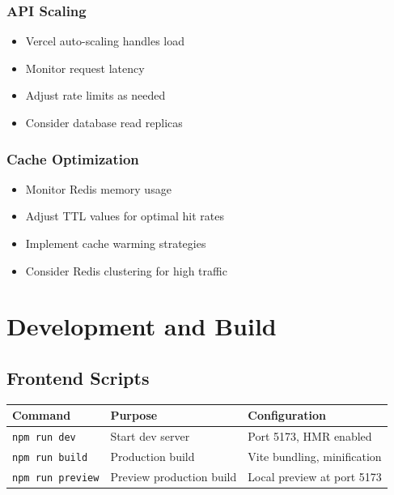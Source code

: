 \documentclass[12pt,a4paper]{report}
\begin{document}
\subsection{API Scaling}

\begin{itemize}
    \item Vercel auto-scaling handles load
    \item Monitor request latency
    \item Adjust rate limits as needed
    \item Consider database read replicas
\end{itemize}

\subsection{Cache Optimization}

\begin{itemize}
    \item Monitor Redis memory usage
    \item Adjust TTL values for optimal hit rates
    \item Implement cache warming strategies
    \item Consider Redis clustering for high traffic
\end{itemize}

\newpage

\chapter{Development and Build}

\section{Frontend Scripts}

\begin{longtable}{|p{2.5cm}|p{3cm}|p{4cm}|}
\hline
\textbf{Command} & \textbf{Purpose} & \textbf{Configuration} \\
\hline
\texttt{npm run dev} & Start dev server & Port 5173, HMR enabled \\
\hline
\texttt{npm run build} & Production build & Vite bundling, minification \\
\hline
\texttt{npm run preview} & Preview production build & Local preview at port 5173 \\
\hline
\end{longtable}
\end{document}
